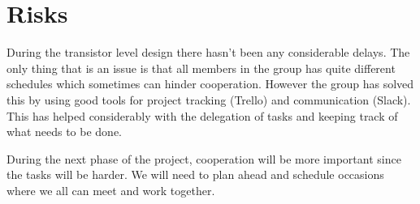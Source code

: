 \section{Risks} \label{sec:risks}
During the transistor level design there hasn't been any considerable delays. The only thing that is an issue is that all members in the group has quite different schedules which sometimes can hinder cooperation. However the group has solved this by using good tools for project tracking (Trello) and communication (Slack). This has helped considerably with the delegation of tasks and keeping track of what needs to be done. 

During the next phase of the project, cooperation will be more important since the tasks will be harder. We will need to plan ahead and schedule occasions where we all can meet and work together.
